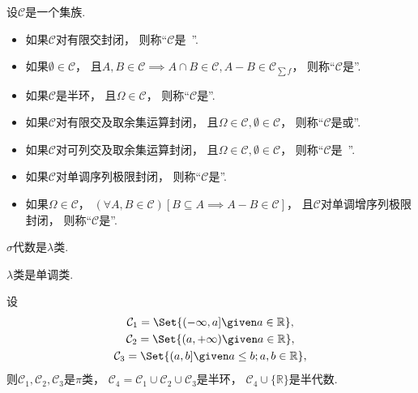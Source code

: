 \begin{definition}
设\(\mathcal{C}\)是一个集族.
\begin{itemize}
	\item 如果\(\mathcal{C}\)对有限交封闭，
	则称“\(\mathcal{C}\)是~”.
	\item 如果\(\emptyset\in\mathcal{C}\)，
	且\(A,B\in\mathcal{C} \implies A \cap B \in \mathcal{C}, A-B \in \mathcal{C}_{\sum f}\)，
	则称“\(\mathcal{C}\)是”.
	\item 如果\(\mathcal{C}\)是半环，
	且\(\Omega\in\mathcal{C}\)，
	则称“\(\mathcal{C}\)是”.
	\item 如果\(\mathcal{C}\)对有限交及取余集运算封闭，
	且\(\Omega\in\mathcal{C},
	\emptyset\in\mathcal{C}\)，
	则称“\(\mathcal{C}\)是或”.
	\item 如果\(\mathcal{C}\)对可列交及取余集运算封闭，
	且\(\Omega\in\mathcal{C},
	\emptyset\in\mathcal{C}\)，
	则称“\(\mathcal{C}\)是~”.
	\item 如果\(\mathcal{C}\)对单调序列极限封闭，
	则称“\(\mathcal{C}\)是”.
	\item 如果\(\Omega\in\mathcal{C}\)，
	\((\forall A,B\in\mathcal{C})[B \subseteq A \implies A-B\in\mathcal{C}]\)，
	且\(\mathcal{C}\)对单调增序列极限封闭，
	则称“\(\mathcal{C}\)是”.
\end{itemize}
\end{definition}

\begin{proposition}
\(\sigma\)代数是\(\lambda\)类.
\end{proposition}
\begin{proposition}
\(\lambda\)类是单调类.
\end{proposition}

\begin{example}
设\begin{gather*}
	\mathcal{C}_1 = \Set{ (-\infty,a] \given a\in\mathbb{R} }, \\
	\mathcal{C}_2 = \Set{ (a,+\infty) \given a\in\mathbb{R} }, \\
	\mathcal{C}_3 = \Set{ (a,b] \given a \leq b; a,b\in\mathbb{R} },
\end{gather*}
则\(\mathcal{C}_1,\mathcal{C}_2,\mathcal{C}_3\)是\(\pi\)类，
\(\mathcal{C}_4 = \mathcal{C}_1 \cup \mathcal{C}_2 \cup \mathcal{C}_3\)是半环，
\(\mathcal{C}_4 \cup \{\mathbb{R}\}\)是半代数.
\end{example}
